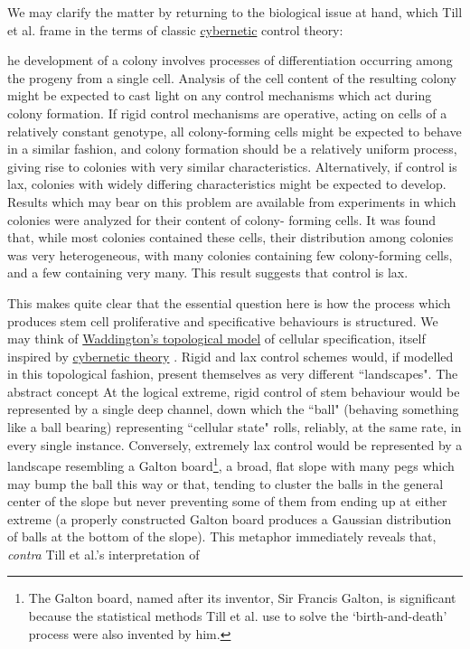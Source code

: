 We may clarify the matter by returning to the biological issue at hand, which Till et al. frame in the terms of classic \hyperref[cybernetics]{cybernetic} \label{TMSmodel2} control theory:

\begin{longquote}
[T]he development of a colony involves processes of differentiation occurring among the progeny from a single cell. Analysis of the cell
content of the resulting colony might be expected to cast light on any control
mechanisms which act during colony formation. If rigid control mechanisms are
operative, acting on cells of a relatively constant genotype, all colony-forming cells
might be expected to behave in a similar fashion, and colony formation should be
a relatively uniform process, giving rise to colonies with very similar characteristics.
Alternatively, if control is lax, colonies with widely differing characteristics might
be expected to develop. Results which may bear on this problem are available
from experiments in which colonies were analyzed for their content of colony-
forming cells. It was found that, while most colonies contained these cells,
their distribution among colonies was very heterogeneous, with many colonies
containing few colony-forming cells, and a few containing very many. This result
suggests that control is lax.
\cite{Till1964}
\end{longquote}

This makes quite clear that the essential question here is how the process which produces stem cell proliferative and specificative behaviours is structured. We may think of \hyperref[Waddington]{Waddington's topological model} of cellular specification, itself inspired by \hyperref[cybernetics]{cybernetic theory} \label{TMSmodel3}. Rigid and lax control schemes would, if modelled in this topological fashion, present themselves as very different ``landscapes". The abstract concept At the logical extreme, rigid control of stem behaviour would be represented by a single deep channel, down which the ``ball" (behaving something like a ball bearing) representing ``cellular state" rolls, reliably, at the same rate, in every single instance. Conversely, extremely lax control would be represented by a landscape resembling a Galton board\footnote{The Galton board, named after its inventor, Sir Francis Galton, is significant because the statistical methods Till et al. use to solve the `birth-and-death' process were also invented by him.}, a broad, flat slope with many pegs which may bump the ball this way or that, tending to cluster the balls in the general center of the slope but never preventing some of them from ending up at either extreme (a properly constructed Galton board produces a Gaussian distribution of balls at the bottom of the slope). This metaphor immediately reveals that, \textit{contra} Till et al.'s interpretation of 


